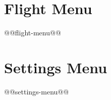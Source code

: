\section{Flight Menu}
\menufont
@@flight-menu@@\sffamily
\newpage

\section{Settings Menu}
\menufont
@@settings-menu@@\sffamily
\newpage